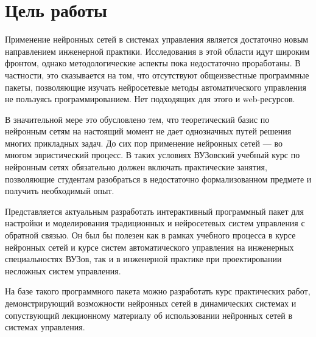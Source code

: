 

\section{Цель работы}

Применение нейронных сетей в системах управления является достаточно
новым направлением инженерной практики.  Исследования в этой области
идут широким фронтом, однако методологические аспекты пока
недостаточно проработаны.  В частности, это сказывается на том, что
отсутствуют общеизвестные программные пакеты, позволяющие изучать
нейросетевые методы автоматического управления не пользуясь
программированием.  Нет подходящих для этого и web-ресурсов.

В значительной мере это обусловлено тем, что теоретический базис по
нейронным сетям на настоящий момент не дает однозначных путей решения
многих прикладных задач.  До сих пор применение нейронных сетей --- во
многом эвристический процесс.  В таких условиях ВУЗовский учебный курс
по нейронным сетях обязательно должен включать практические занятия,
позволяющие студентам разобраться в недостаточно формализованном
предмете и получить необходимый опыт.

Представляется актуальным разработать интерактивный программный пакет
для настройки и моделирования традиционных и нейросетевых систем
управления с обратной связью.  Он был бы полезен как в рамках учебного
процесса в курсе нейронных сетей и курсе систем автоматического
управления на инженерных специальностях ВУЗов, так и в инженерной
практике при проектировании несложных систем управления.

На базе такого программного пакета можно разработать курс практических
работ, демонстрирующий возможности нейронных сетей в динамических
системах и сопуствующий лекционному материалу об использовании
нейронных сетей в системах управления.

